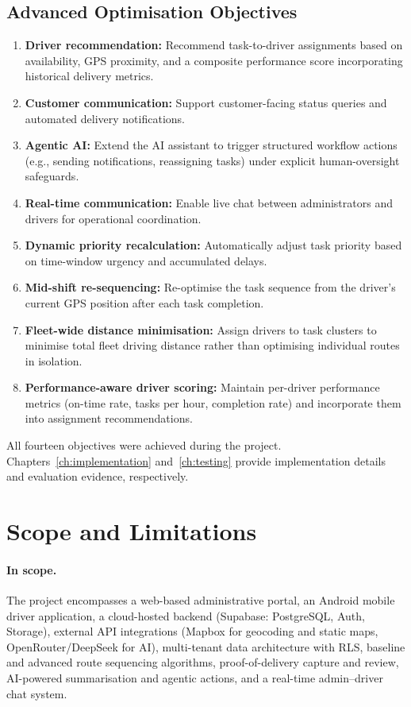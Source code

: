 \subsection{Advanced Optimisation Objectives}
\begin{enumerate}[resume]
  \item \textbf{Driver recommendation:} Recommend task-to-driver assignments based on availability, GPS proximity, and a composite performance score incorporating historical delivery metrics.
  \item \textbf{Customer communication:} Support customer-facing status queries and automated delivery notifications.
  \item \textbf{Agentic AI:} Extend the AI assistant to trigger structured workflow actions (e.g., sending notifications, reassigning tasks) under explicit human-oversight safeguards.
  \item \textbf{Real-time communication:} Enable live chat between administrators and drivers for operational coordination.
  \item \textbf{Dynamic priority recalculation:} Automatically adjust task priority based on time-window urgency and accumulated delays.
  \item \textbf{Mid-shift re-sequencing:} Re-optimise the task sequence from the driver's current GPS position after each task completion.
  \item \textbf{Fleet-wide distance minimisation:} Assign drivers to task clusters to minimise total fleet driving distance rather than optimising individual routes in isolation.
  \item \textbf{Performance-aware driver scoring:} Maintain per-driver performance metrics (on-time rate, tasks per hour, completion rate) and incorporate them into assignment recommendations.
\end{enumerate}

All fourteen objectives were achieved during the project. Chapters~\ref{ch:implementation} and~\ref{ch:testing} provide implementation details and evaluation evidence, respectively.

\section{Scope and Limitations}
\label{sec:scope}

\paragraph{In scope.}
The project encompasses a web-based administrative portal, an Android mobile driver application, a cloud-hosted backend (Supabase: PostgreSQL, Auth, Storage), external API integrations (Mapbox for geocoding and static maps, OpenRouter/DeepSeek for AI), multi-tenant data architecture with RLS, baseline and advanced route sequencing algorithms, proof-of-delivery capture and review, AI-powered summarisation and agentic actions, and a real-time admin--driver chat system.

